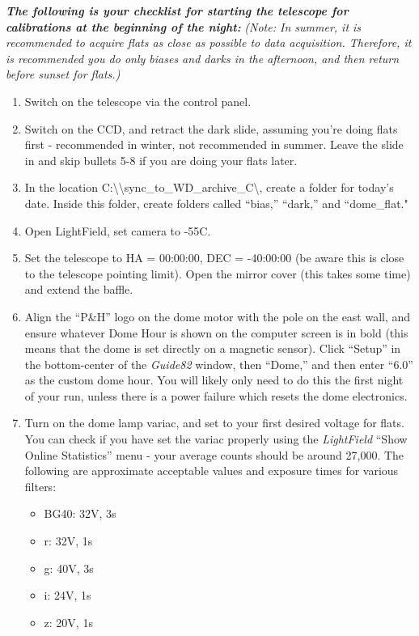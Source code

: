 \documentclass[12pt]{article}
\begin{document}
\noindent\textit{\textbf{The following is your checklist for starting the telescope for calibrations at the beginning of the night:}}
\textit{(Note: In summer, it is recommended to acquire flats as close as possible to data acquisition. Therefore, it is recommended you do only biases and darks in the afternoon, and then return before sunset for flats.)}
\begin{enumerate}
   \item Switch on the telescope via the control panel.
   \item Switch on the CCD, and retract the dark slide, assuming you're doing flats first - recommended in winter, not recommended in summer. Leave the slide in and skip bullets 5-8 if you are doing your flats later.
   \item In the location C:\textbackslash\textbackslash sync\_to\_WD\_archive\_C\textbackslash, create a folder for today's date. Inside this folder, create folders called ``bias,'' ``dark,'' and ``dome\_flat."
   \item Open LightField, set camera to -55\textdegree C.
   \item Set the telescope to HA = 00:00:00, DEC = -40:00:00 (be aware this is close to the telescope pointing limit). Open the mirror cover (this takes some time) and extend the baffle.
   \item Align the ``P\&H'' logo on the dome motor with the pole on the east wall, and ensure whatever Dome Hour is shown on the computer screen is in bold (this means that the dome is set directly on a magnetic sensor). Click ``Setup'' in the bottom-center of the \textit{Guide82} window, then ``Dome,'' and then enter ``6.0'' as the custom dome hour. You will likely only need to do this the first night of your run, unless there is a power failure which resets the dome electronics.
   \item Turn on the dome lamp variac, and set to your first desired voltage for flats. You can check if you have set the variac properly using the \textit{LightField} ``Show Online Statistics'' menu - your average counts should be around 27,000. The following are approximate acceptable values and exposure times for various filters:
   \begin{itemize}
      \item BG40: 32V, 3s
      \item r: 32V, 1s
      \item g: 40V, 3s
      \item i: 24V, 1s
      \item z: 20V, 1s

\end{itemize}
\end{enumerate}
\end{document}
